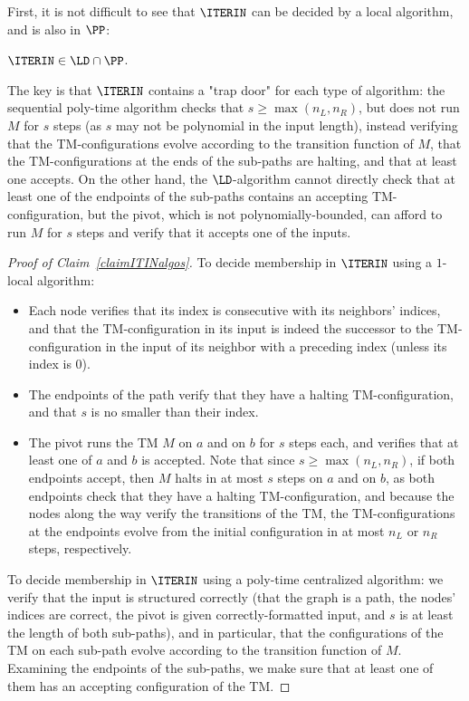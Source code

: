 First, it is not difficult to see that $\ITERIN$ can be decided by a local algorithm,
and is also in $\PP$:
\begin{claim}\label{claimITINalgos}
	$\ITERIN \in \LD \cap \PP$.
\end{claim}
The key is that $\ITERIN$ contains a "trap door" for each type of algorithm:
the sequential poly-time algorithm checks that $s \geq \max(n_L, n_R)$,
but does not run $M$ for $s$ steps (as $s$ may not be polynomial in the input length),
instead verifying that the TM-configurations evolve according to the transition function of $M$,
that the TM-configurations at the ends of the sub-paths are halting, and that at least one accepts.
On the other hand, the $\LD$-algorithm cannot directly check that at least one of the endpoints of the sub-paths
contains an accepting TM-configuration,
but the pivot,
which is not polynomially-bounded,
can afford to run $M$ for $s$ steps and verify that it accepts one of the inputs.

\begin{proof}[Proof of Claim~\ref{claimITINalgos}]
	To decide membership in $\ITERIN$ using a $1$-local algorithm:
	\begin{itemize}
		\item Each node verifies that its index is consecutive with its neighbors' indices,
			and that the TM-configuration in its input is indeed the successor
			to the TM-configuration in the input of its neighbor with a preceding index
			(unless its index is 0).
		\item The endpoints of the path verify that they have a halting TM-configuration,
			and that $s$ is no smaller than their index.
		\item The pivot runs the TM $M$ on $a$ and on $b$ for $s$ steps each,
			and verifies that at least one of $a$ and $b$ is accepted.
			Note that since $s \geq \max(n_L, n_R)$,
			if both endpoints accept,
			then $M$ halts in at most $s$ steps on $a$ and on $b$,
			as both endpoints check that they have a halting TM-configuration,
			and because the nodes along the way
			verify the transitions of the TM,
			the TM-configurations at the endpoints evolve from the initial configuration
			in at most $n_L$ or $n_R$ steps, respectively.
	\end{itemize}
	To decide membership in $\ITERIN$ using a poly-time centralized algorithm:
	we verify that the input is structured correctly (that the graph is a path,
	the nodes' indices
	are correct, the pivot is given correctly-formatted input,
	and $s$ is at least the length of both sub-paths),
	and in particular, 
	that the configurations of the TM on each sub-path evolve according to the transition
	function of $M$.
	Examining the endpoints of the sub-paths,
	we make sure that at least one of them has an accepting configuration of the TM.
\end{proof}

